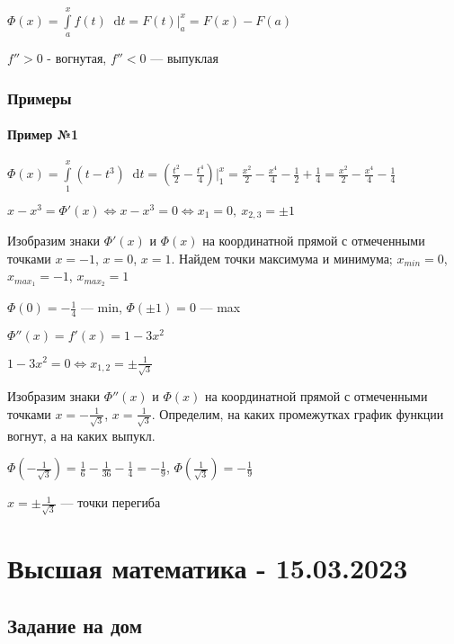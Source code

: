 \documentclass{article}
\newcommand*\diff{\mathop{}\!\mathrm{d}}
\begin{document}
$\Phi(x) = \int\limits_{a}^{x} f(t) \diff t = F(t) \bigg|_{a}^{x} = F(x) - F(a)$


\hfill

$f'' > 0$ - вогнутая, $f'' < 0$ — выпуклая

\subsubsection{Примеры}

\paragraph{Пример №1} $\Phi(x) = \int\limits_{1}^{x} (t - t^3) \diff t = (\frac{t^2}{2} - \frac{t^4}{4}) \bigg|_{1}^{x} = \frac{x^2}{2} - \frac{x^4}{4} - \frac{1}{2} + \frac{1}{4} = \frac{x^2}{2} - \frac{x^4}{4} - \frac{1}{4}$

$x - x^3 = \Phi'(x) \Longleftrightarrow x - x^3 = 0 \Longleftrightarrow x_1 = 0, \ x_{2, 3} = \pm 1$

Изобразим знаки $\Phi'(x)$ и $\Phi(x)$ на координатной прямой с отмеченными точками $x = -1$, $x = 0$, $x = 1$. Найдем точки максимума и минимума; $x_{min} = 0$, $x_{max_1} = -1$, $x_{max_2} = 1$

$\Phi(0) = - \frac{1}{4}$ — min, $\Phi(\pm 1) = 0$ — max

\hfill

$\Phi''(x) = f'(x) = 1 - 3x^2$

$1 - 3x^2 = 0 \Longleftrightarrow x_{1, 2} = \pm \frac{1}{\sqrt{3}}$

Изобразим знаки $\Phi''(x)$ и $\Phi(x)$ на координатной прямой с отмеченными точками $x = -\frac{1}{\sqrt{3}}$, $x = \frac{1}{\sqrt{3}}$. Определим, на каких промежутках график функции вогнут, а на каких выпукл.


$\Phi(-\frac{1}{\sqrt{3}}) = \frac{1}{6} - \frac{1}{36} - \frac{1}{4} = -\frac{1}{9}$, $\Phi(\frac{1}{\sqrt{3}}) = -\frac{1}{9}$

$x = \pm \frac{1}{\sqrt{3}}$ — точки перегиба

\pagebreak
\section{Высшая математика - 15.03.2023}

\subsection{Задание на дом}
\end{document}
